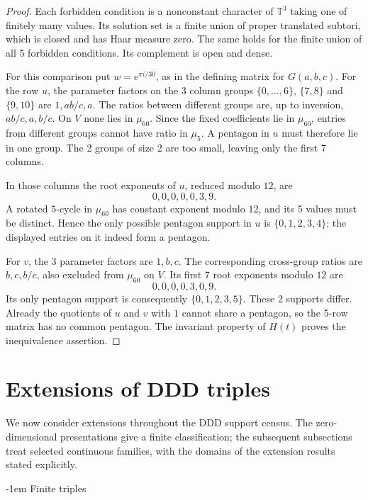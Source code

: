 \documentclass[11pt,a4paper]{article}
\makeatletter
\theoremstyle{plain}
\theoremstyle{definition}
\theoremstyle{plain}
\renewcommand\subsection{\@startsection{subsection}{2}{\z@}  {\medskipamount}  {-1em}  {\normalfont\normalsize\bfseries}}
\makeatother
\begin{document}
\begin{proof}
Each forbidden condition is a nonconstant character of $\mathbb T^3$ taking one of finitely many values. Its solution set is a finite union of proper translated subtori, which is closed and has Haar measure zero. The same holds for the finite union of all 5 forbidden conditions. Its complement is open and dense.

For this comparison put $w=e^{\pi i/30}$, as in the defining matrix for $G(a,b,c)$. For the row $u$, the parameter factors on the 3 column groups $\{0,\ldots,6\}$, $\{7,8\}$ and $\{9,10\}$ are $1,ab/c,a$. The ratios between different groups are, up to inversion, $ab/c,a,b/c$. On $V$ none lies in $\mu_{60}$. Since the fixed coefficients lie in $\mu_{60}$, entries from different groups cannot have ratio in $\mu_5$. A pentagon in $u$ must therefore lie in one group. The 2 groups of size 2 are too small, leaving only the first 7 columns.

In those columns the root exponents of $u$, reduced modulo $12$, are
$$0,0,0,0,0,3,9.$$
A rotated $5$-cycle in $\mu_{60}$ has constant exponent modulo $12$, and its 5 values must be distinct. Hence the only possible pentagon support in $u$ is $\{0,1,2,3,4\}$; the displayed entries on it indeed form a pentagon.

For $v$, the 3 parameter factors are $1,b,c$. The corresponding cross-group ratios are $b,c,b/c$, also excluded from $\mu_{60}$ on $V$. Its first 7 root exponents modulo $12$ are
$$0,0,0,0,3,0,9.$$
Its only pentagon support is consequently $\{0,1,2,3,5\}$. These 2 supports differ. Already the quotients of $u$ and $v$ with $1$ cannot share a pentagon, so the 5-row matrix has no common pentagon. The invariant property of $H(t)$ proves the inequivalence assertion.
\end{proof}

\section{Extensions of DDD triples}\label{sec:extensionsDDD}\label{sec:continuousDDD}
We now consider extensions throughout the $\mathrm{DDD}$ support census. The zero-dimensional presentations give a finite classification; the subsequent subsections treat selected continuous families, with the domains of the extension results stated explicitly.

\subsection{Finite triples}\label{sec:finiteDDD}\label{sec:DDDfourth}
\end{document}
